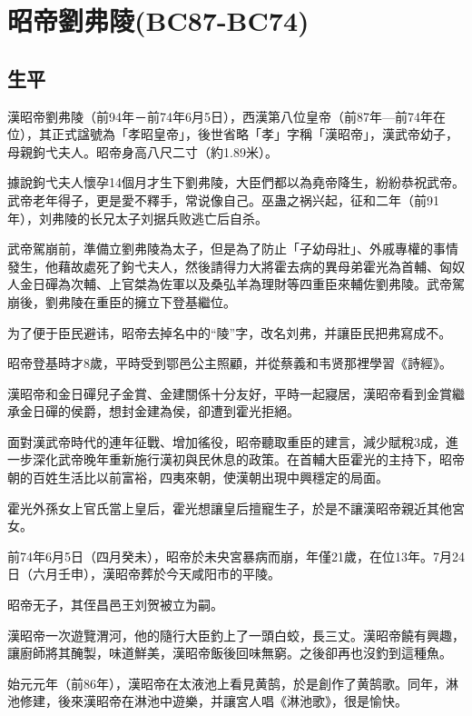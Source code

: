 
\section{昭帝劉弗陵\tiny(BC87-BC74)}

\subsection{生平}

漢昭帝劉弗陵（前94年－前74年6月5日），西漢第八位皇帝（前87年—前74年在位），其正式諡號為「孝昭皇帝」，後世省略「孝」字稱「漢昭帝」，漢武帝幼子，母親鉤弋夫人。昭帝身高八尺二寸（約1.89米）。

據說鉤弋夫人懷孕14個月才生下劉弗陵，大臣們都以為堯帝降生，紛紛恭祝武帝。武帝老年得子，更是愛不釋手，常说像自己。巫蛊之祸兴起，征和二年（前91年），刘弗陵的长兄太子刘据兵败逃亡后自杀。

武帝駕崩前，準備立劉弗陵為太子，但是為了防止「子幼母壯」、外戚專權的事情發生，他藉故處死了鉤弋夫人，然後請得力大將霍去病的異母弟霍光為首輔、匈奴人金日磾為次輔、上官桀為佐軍以及桑弘羊為理財等四重臣來輔佐劉弗陵。武帝駕崩後，劉弗陵在重臣的擁立下登基繼位。

为了便于臣民避讳，昭帝去掉名中的“陵”字，改名刘弗，并讓臣民把弗寫成不。

昭帝登基時才8歲，平時受到鄂邑公主照顧，并從蔡義和韦贤那裡學習《詩經》。

漢昭帝和金日磾兒子金賞、金建關係十分友好，平時一起寢居，漢昭帝看到金賞繼承金日磾的侯爵，想封金建為侯，卻遭到霍光拒絕。

面對漢武帝時代的連年征戰、增加徭役，昭帝聽取重臣的建言，減少賦稅3成，進一步深化武帝晚年重新施行漢初與民休息的政策。在首輔大臣霍光的主持下，昭帝朝的百姓生活比以前富裕，四夷來朝，使漢朝出現中興穩定的局面。

霍光外孫女上官氏當上皇后，霍光想讓皇后擅寵生子，於是不讓漢昭帝親近其他宮女。

前74年6月5日（四月癸未），昭帝於未央宮暴病而崩，年僅21歲，在位13年。7月24日（六月壬申），漢昭帝葬於今天咸阳市的平陵。

昭帝无子，其侄昌邑王刘贺被立为嗣。

漢昭帝一次遊覽渭河，他的隨行大臣釣上了一頭白蛟，長三丈。漢昭帝饒有興趣，讓廚師將其醃製，味道鮮美，漢昭帝飯後回味無窮。之後卻再也沒釣到這種魚。

始元元年（前86年），漢昭帝在太液池上看見黄鹄，於是創作了黄鹄歌。同年，淋池修建，後來漢昭帝在淋池中遊樂，并讓宮人唱《淋池歌》，很是愉快。

